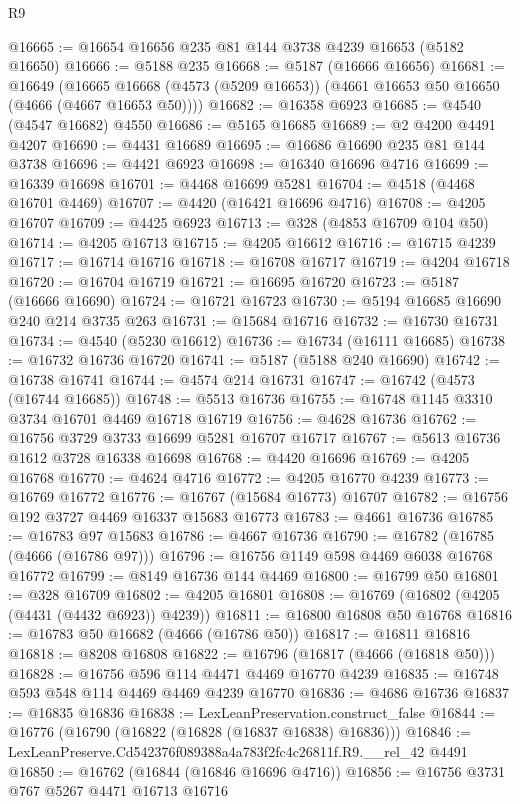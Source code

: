 \begin{lexlean}{R9}
\begin{coremodule}
@16665 := @16654 @16656 @235 @81 @144 @3738 @4239 @16653 (@5182 @16650)
@16666 := @5188 @235
@16668 := @5187 (@16666 @16656)
@16681 := @16649
    (@16665 @16668 (@4573 (@5209 @16653)) (@4661 @16653 @50 @16650 (@4666 (@4667 @16653 @50))))
@16682 := @16358 @6923
@16685 := @4540 (@4547 @16682) @4550
@16686 := @5165 @16685
@16689 := @2 @4200 @4491 @4207
@16690 := @4431 @16689
@16695 := @16686 @16690 @235 @81 @144 @3738
@16696 := @4421 @6923
@16698 := @16340 @16696 @4716
@16699 := @16339 @16698
@16701 := @4468 @16699 @5281
@16704 := @4518 (@4468 @16701 @4469)
@16707 := @4420 (@16421 @16696 @4716)
@16708 := @4205 @16707
@16709 := @4425 @6923
@16713 := @328 (@4853 @16709 @104 @50)
@16714 := @4205 @16713
@16715 := @4205 @16612
@16716 := @16715 @4239
@16717 := @16714 @16716
@16718 := @16708 @16717
@16719 := @4204 @16718
@16720 := @16704 @16719
@16721 := @16695 @16720
@16723 := @5187 (@16666 @16690)
@16724 := @16721 @16723
@16730 := @5194 @16685 @16690 @240 @214 @3735 @263
@16731 := @15684 @16716
@16732 := @16730 @16731
@16734 := @4540 (@5230 @16612)
@16736 := @16734 (@16111 @16685)
@16738 := @16732 @16736 @16720
@16741 := @5187 (@5188 @240 @16690)
@16742 := @16738 @16741
@16744 := @4574 @214 @16731
@16747 := @16742 (@4573 (@16744 @16685))
@16748 := @5513 @16736
@16755 := @16748 @1145 @3310 @3734 @16701 @4469 @16718 @16719
@16756 := @4628 @16736
@16762 := @16756 @3729 @3733 @16699 @5281 @16707 @16717
@16767 := @5613 @16736 @1612 @3728 @16338 @16698
@16768 := @4420 @16696
@16769 := @4205 @16768
@16770 := @4624 @4716
@16772 := @4205 @16770 @4239
@16773 := @16769 @16772
@16776 := @16767 (@15684 @16773) @16707
@16782 := @16756 @192 @3727 @4469 @16337 @15683 @16773
@16783 := @4661 @16736
@16785 := @16783 @97 @15683
@16786 := @4667 @16736
@16790 := @16782 (@16785 (@4666 (@16786 @97)))
@16796 := @16756 @1149 @598 @4469 @6038 @16768 @16772
@16799 := @8149 @16736 @144 @4469
@16800 := @16799 @50
@16801 := @328 @16709
@16802 := @4205 @16801
@16808 := @16769 (@16802 (@4205 (@4431 (@4432 @6923)) @4239))
@16811 := @16800 @16808 @50 @16768
@16816 := @16783 @50 @16682 (@4666 (@16786 @50))
@16817 := @16811 @16816
@16818 := @8208 @16808
@16822 := @16796 (@16817 (@4666 (@16818 @50)))
@16828 := @16756 @596 @114 @4471 @4469 @16770 @4239
@16835 := @16748 @593 @548 @114 @4469 @4469 @4239 @16770
@16836 := @4686 @16736
@16837 := @16835 @16836
@16838 := LexLeanPreservation.construct_false
@16844 := @16776 (@16790 (@16822 (@16828 (@16837 @16838) @16836)))
@16846 := LexLeanPreserve.Cd542376f089388a4a783f2fc4c26811f.R9.__rel_42 @4491
@16850 := @16762 (@16844 (@16846 @16696 @4716))
@16856 := @16756 @3731 @767 @5267 @4471 @16713 @16716

\end{coremodule}
\end{lexlean}
